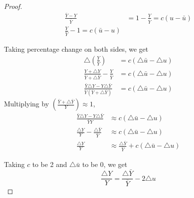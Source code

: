 \begin{proof}
    \begin{align*}
        \frac{\bar{Y} - Y }{ \bar{Y} } &= 1 - \frac{Y}{ \bar{Y} } = c( u - \bar{u} ) \\
        \frac{Y}{ \bar{Y} } - 1= c ( \bar{u}  - u )
    \end{align*}

    Taking percentage change on both sides, we get 
    \begin{align*}
        \triangle \left( \frac{Y}{\bar{Y} } \right)  &= c \left( \triangle \bar{u} - \triangle{u} \right)  \\ 
        \frac{Y + \triangle Y}{\bar{Y}  + \triangle \bar{Y} } - \frac{Y}{ \bar{Y} } &= c \left( \triangle \bar{u}  - \triangle u \right)  \\
        \frac{\bar{Y} \triangle Y - Y \triangle \bar{Y}  }{ \bar{Y}  ( \bar{Y}  + \triangle \bar{Y} )} &= c \left( \triangle \bar{u}  - \triangle u \right) 
    \end{align*}
    Multiplying by  $ \left( \frac{\bar{Y}  + \triangle \bar{Y} }{Y} \right) \approx 1 $, 
    \begin{align*}
        \frac{\bar{Y} \triangle Y - Y \triangle \bar{Y}  }{ \bar{Y}Y} &\approx c \left( \triangle \bar{u}  - \triangle u \right)  \\
        \frac{\triangle Y}{Y} - \frac{\triangle \bar{Y} }{\bar{Y} } &\approx c \left( \triangle \bar{u}  - \triangle u \right)  \\
        \frac{\triangle Y}{Y} & \approx \frac{\triangle \bar{Y} }{ \bar{Y} } + c \left( \triangle \bar{u}  - \triangle u  \right) 
    \end{align*}

    Taking $c$ to be 2 and $\triangle \bar{u} $ to be 0, we get
    \[
    \frac{\triangle Y}{Y} = \frac{\triangle \bar{Y} }{ \bar{Y} }  - 2 \triangle u
    \]
\end{proof}


\newpage


















